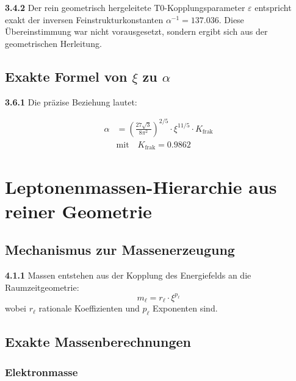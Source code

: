 \documentclass[12pt,a4paper]{article}
\newcommand{\xipar}{\xi}
\begin{document}
	\begin{tcolorbox}[colback=blue!5!white,colframe=blue!75!black,title=Bemerkenswerte Übereinstimmung]
		\textbf{3.4.2} Der rein geometrisch hergeleitete T0-Kopplungsparameter $\varepsilon$ entspricht exakt der inversen Feinstrukturkonstanten $\alpha^{-1} = 137.036$. Diese Übereinstimmung war nicht vorausgesetzt, sondern ergibt sich aus der geometrischen Herleitung.
	\end{tcolorbox}
	
	
	\subsection{Exakte Formel von $\xipar$ zu $\alpha$}
	
	\noindent \textbf{3.6.1} Die präzise Beziehung lautet:
	\begin{keyresult}
		\begin{align}
			\alpha &= \left( \frac{27 \sqrt{3}}{8 \pi^2} \right)^{2/5} \cdot \xipar^{11/5} \cdot K_{\text{frak}} \\
			&\text{mit} \quad K_{\text{frak}} = 0.9862
		\end{align}
	\end{keyresult}
	
	\section{Leptonenmassen-Hierarchie aus reiner Geometrie}
	
	\subsection{Mechanismus zur Massenerzeugung}
	
	\noindent \textbf{4.1.1} Massen entstehen aus der Kopplung des Energiefelds an die Raumzeitgeometrie:
	\begin{equation}
		m_{\ell} = r_{\ell} \cdot \xipar^{p_{\ell}}
	\end{equation}
	wobei $r_{\ell}$ rationale Koeffizienten und $p_{\ell}$ Exponenten sind.
	
	\subsection{Exakte Massenberechnungen}
	
	\subsubsection{Elektronmasse}
	
\end{document}
